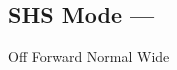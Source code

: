 \subsection[SHS Mode]{SHS Mode --- \UiKey{\SET}}









































Off
Forward
Normal
Wide

